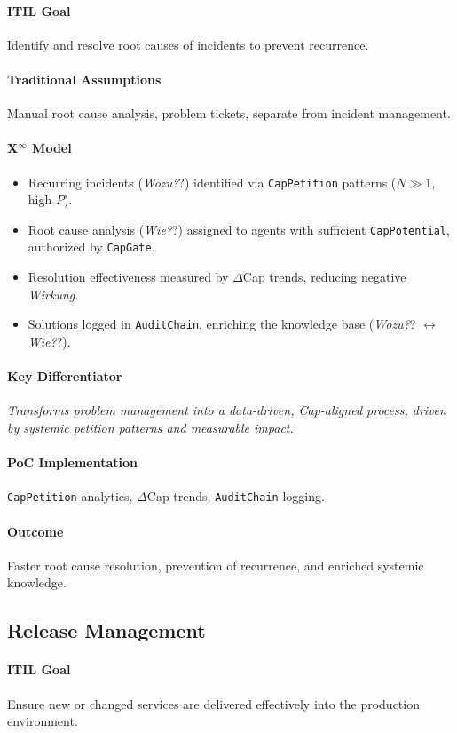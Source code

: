 \documentclass[12pt, a4paper]{scrartcl}
\newcommand{\Xinf}{X$^\infty$}                        %
\newcommand{\DeltaCap}{$\Delta$Cap}                    %
\newcommand{\CapPotential}{\texttt{CapPotential}}    %
\newcommand{\Wirkung}{\textit{Wirkung}}                 %
\newcommand{\CapGate}{\texttt{CapGate}}
\newcommand{\AuditChain}{\texttt{AuditChain}}
\newcommand{\CapPetition}{\texttt{CapPetition}}        %
\newcommand{\Wozu}{\textit{Wozu?}}                      %
\newcommand{\Wie}{\textit{Wie?}}                        %
\begin{document}
\paragraph{ITIL Goal} Identify and resolve root causes of incidents to prevent recurrence.
\paragraph{Traditional Assumptions} Manual root cause analysis, problem tickets, separate from incident management.
\paragraph*{\Xinf{} Model}
\begin{itemize}
    \item Recurring incidents (\Wozu?) identified via \CapPetition{} patterns ($N \gg 1$, high $P$).
    \item Root cause analysis (\Wie?) assigned to agents with sufficient \CapPotential{}, authorized by \CapGate{}.
    \item Resolution effectiveness measured by \DeltaCap{} trends, reducing negative \Wirkung{}.
    \item Solutions logged in \AuditChain{}, enriching the knowledge base (\Wozu? $\leftrightarrow$ \Wie?). %
\end{itemize}
\paragraph{Key Differentiator} \textit{Transforms problem management into a data-driven, Cap-aligned process, driven by systemic petition patterns and measurable impact.}
\paragraph{PoC Implementation} \CapPetition{} analytics, \DeltaCap{} trends, \AuditChain{} logging.
\paragraph{Outcome} Faster root cause resolution, prevention of recurrence, and enriched systemic knowledge.

\subsection{Release Management} %
\paragraph{ITIL Goal} Ensure new or changed services are delivered effectively into the production environment.
\end{document}
